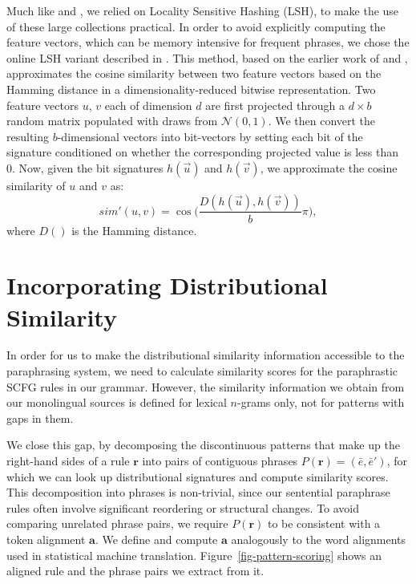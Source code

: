 \documentclass[11pt]{article}
\begin{document}
Much like  and , we
relied on Locality Sensitive Hashing (LSH), to make the use of these
large collections practical. In order to avoid explicitly computing
the feature vectors, which can be memory intensive for frequent
phrases, we chose the online LSH variant described in
\cite{VanDurmeLallACL10}. This method, based on the earlier work of
 and , approximates the
cosine similarity between two feature vectors based on the Hamming
distance in a dimensionality-reduced bitwise representation. Two
feature vectors $u$, $v$ each of dimension $d$ are first projected
through a $d \times b$ random matrix populated with draws from
$\mathcal{N}(0,1)$. We then convert the resulting $b$-dimensional
vectors into bit-vectors by setting each bit of the signature
conditioned on whether the corresponding projected value is less than
0. Now, given the bit signatures $h(\vec{u})$ and $h(\vec{v})$, we
approximate the cosine similarity of $u$ and $v$ as:
\begin{equation*}
  \mathit{sim'}(u, v) =
  \cos\Big(\frac{D(h(\vec{u}),h(\vec{v}))}{b}\pi\Big) ,
\end{equation*}
where $D()$ is the Hamming distance.



\section{Incorporating Distributional Similarity}
\label{sec-scoring}

In order for us to make the distributional similarity information
accessible to the paraphrasing system, we need to calculate similarity
scores for the paraphrastic SCFG rules in our grammar. However, the
similarity information we obtain from our monolingual sources is
defined for lexical $n$-grams only, not for patterns with gaps in
them.  

We close this gap, by decomposing the discontinuous patterns that make
up the right-hand sides of a rule $\mathbf{r}$ into pairs of
contiguous phrases $P(\mathbf{r}) = (\bar{e}, \bar{e}')$, for which we
can look up distributional signatures and compute similarity
scores. This decomposition into phrases is non-trivial, since our
sentential paraphrase rules often involve significant reordering or
structural changes. To avoid comparing unrelated phrase pairs, we
require $P(\mathbf{r})$ to be consistent with a token alignment
$\mathbf{a}$. We define and compute $\mathbf{a}$ analogously to the
word alignments used in statistical machine
translation. Figure~\ref{fig-pattern-scoring} shows an aligned rule
and the phrase pairs we extract from it.
\end{document}
